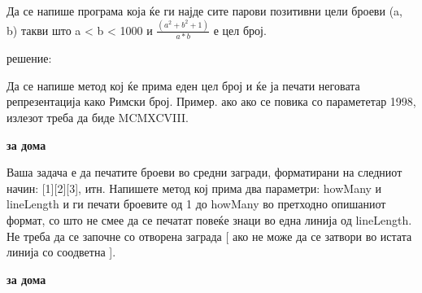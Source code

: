 

\lfoot{}
\cfoot{\thepage}
\rfoot{}
\usepackage{fancyvrb}
\usepackage{xcolor}
\usepackage{textcomp}


\begin{questions}

\question

Да се напише програма која ќе ги најде сите парови позитивни цели броеви (a, b)
такви што a < b < 1000 и $\frac{(a^2 + b^2 + 1)}{a * b}$ е цел број.

решение:



\question

Да се напише метод кој ќе прима еден цел број и ќе ја печати неговата
репрезентација како Римски број. Пример. ако ако се повика со парамететар 1998,
излезот треба да биде MCMXCVIII.

\textbf{за дома}

\question
Ваша задача е да печатите броеви во средни загради, форматирани на следниот
начин: [1][2][3], итн. Напишете метод кој прима два параметри: howMany и
lineLength и ги печати броевите од 1 до howMany во претходно опишаниот формат,
со што не смее да се печатат повеќе знаци во една линија од lineLength. Не треба
да се започне со отворена заграда [ ако не може да се затвори во истата линија
со соодветна ].

\textbf{за дома}

\end{questions}


